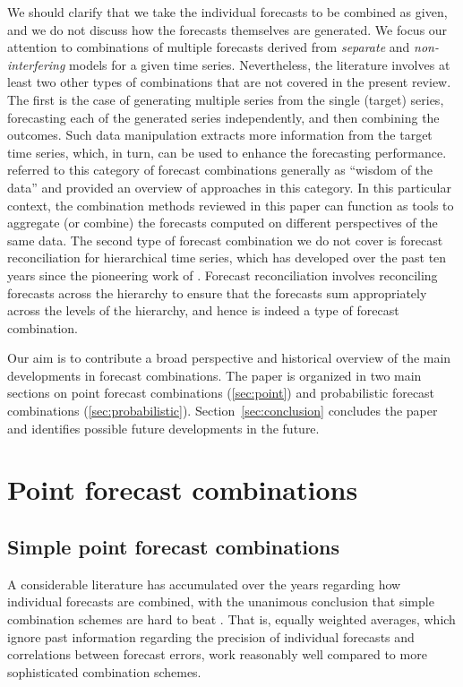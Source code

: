 \documentclass[a4paper,11pt]{article}
\begin{document}
We should clarify that we take the individual forecasts to be combined as given, and we do not discuss how the forecasts themselves are generated. We focus our attention to combinations of multiple forecasts derived from \textit{separate} and \textit{non-interfering} models for a given time series. Nevertheless, the literature involves at least two other types of combinations that are not covered in the present review. The first is the case of generating multiple series from the single (target) series, forecasting each of the generated series independently, and then combining the outcomes. Such data manipulation extracts more information from the target time series, which, in turn, can be used to enhance the forecasting performance. \citet{Petropoulos2021-wisdom} referred to this category of forecast combinations generally as ``wisdom of the data'' and provided an overview of approaches in this category. In this particular context, the combination methods reviewed in this paper can function as tools to aggregate (or combine) the forecasts computed on different perspectives of the same data. The second type of forecast combination we do not cover is forecast reconciliation for hierarchical time series, which has developed over the past ten years since the pioneering work of \citet{Hyndman2011-sd}. Forecast reconciliation involves reconciling forecasts across the hierarchy to ensure that the forecasts sum appropriately across the levels of the hierarchy, and hence is indeed a type of forecast combination.

Our aim is to contribute a broad perspective and historical overview of the main developments in forecast combinations. The paper is organized in two main sections on point forecast combinations (\autoref{sec:point}) and probabilistic forecast combinations (\autoref{sec:probabilistic}). Section~\ref{sec:conclusion} concludes the paper and identifies possible future developments in the future.

\section{Point forecast combinations}
\label{sec:point}

\subsection{Simple point forecast combinations}
\label{sec:simple_comb}

A considerable literature has accumulated over the years regarding how individual forecasts are combined, with the unanimous conclusion that simple combination schemes are hard to beat \citep{Kang1986-kq,Clemen1989-fb,Fischer1999-kz,Stock2004-rq,Lichtendahl2020-ut}. That is, equally weighted averages, which ignore past information regarding the precision of individual forecasts and correlations between forecast errors, work reasonably well compared to more sophisticated combination schemes.
\end{document}
